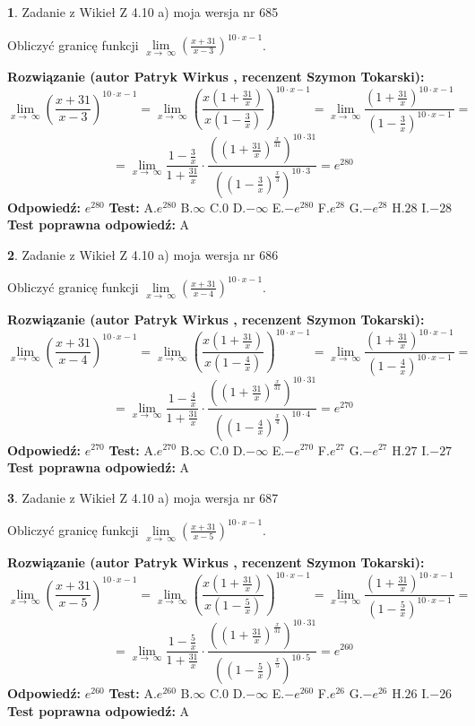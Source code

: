 \documentclass[12pt, a4paper]{article}
\theoremstyle{definition} %
\newtheorem{zad}{}
\newcommand{\zadStart}[1]{\begin{zad}#1\newline}
\newcommand{\zadStop}{\end{zad}}
\newcommand{\rozwStart}[2]{\noindent \textbf{Rozwiązanie (autor #1 , recenzent #2): }\newline}
\newcommand{\rozwStop}{\newline}
\newcommand{\odpStart}{\noindent \textbf{Odpowiedź:}\newline}
\newcommand{\odpStop}{\newline}
\newcommand{\testStart}{\noindent \textbf{Test:}\newline}
\newcommand{\testStop}{\newline}
\newcommand{\kluczStart}{\noindent \textbf{Test poprawna odpowiedź:}\newline}
\newcommand{\kluczStop}{\newline}
\begin{document}
\zadStart{Zadanie z Wikieł Z 4.10 a) moja wersja nr 685}

Obliczyć granicę funkcji  $\lim\limits_{x\to\ \infty}(\frac{x+31}{x-3})^{10\cdot x-1}$.
\zadStop
\rozwStart{Patryk Wirkus}{Szymon Tokarski}
$$\lim\limits_{x\to\ \infty}(\frac{x+31}{x-3})^{10\cdot x-1} = \lim\limits_{x\to\ \infty}(\frac{x(1+\frac{31}{x})}{x(1-\frac{3}{x})})^{10\cdot x-1}=\lim\limits_{x\to\ \infty}\frac{(1+\frac{31}{x})^{10\cdot x-1}}{(1-\frac{3}{x})^{10\cdot x-1}}=$$
$$=\lim\limits_{x\to\ \infty}\frac{1-\frac{3}{x}}{1+\frac{31}{x}}\cdot\frac{((1+\frac{31}{x})^{\frac{x}{31}})^{10\cdot31}}{((1-\frac{3}{x})^{\frac{x}{3}})^{10\cdot3}}=e^{280}$$
\rozwStop
\odpStart
$e^{280}$
\odpStop
\testStart
A.$e^{280}$ B.$\infty$ C.$0$ D.$-\infty$ E.$-e^{280}$
F.$e^{28}$ G.$-e^{28}$
H.$28$
I.$-28$
\testStop
\kluczStart
A
\kluczStop



\zadStart{Zadanie z Wikieł Z 4.10 a) moja wersja nr 686}

Obliczyć granicę funkcji  $\lim\limits_{x\to\ \infty}(\frac{x+31}{x-4})^{10\cdot x-1}$.
\zadStop
\rozwStart{Patryk Wirkus}{Szymon Tokarski}
$$\lim\limits_{x\to\ \infty}(\frac{x+31}{x-4})^{10\cdot x-1} = \lim\limits_{x\to\ \infty}(\frac{x(1+\frac{31}{x})}{x(1-\frac{4}{x})})^{10\cdot x-1}=\lim\limits_{x\to\ \infty}\frac{(1+\frac{31}{x})^{10\cdot x-1}}{(1-\frac{4}{x})^{10\cdot x-1}}=$$
$$=\lim\limits_{x\to\ \infty}\frac{1-\frac{4}{x}}{1+\frac{31}{x}}\cdot\frac{((1+\frac{31}{x})^{\frac{x}{31}})^{10\cdot31}}{((1-\frac{4}{x})^{\frac{x}{4}})^{10\cdot4}}=e^{270}$$
\rozwStop
\odpStart
$e^{270}$
\odpStop
\testStart
A.$e^{270}$ B.$\infty$ C.$0$ D.$-\infty$ E.$-e^{270}$
F.$e^{27}$ G.$-e^{27}$
H.$27$
I.$-27$
\testStop
\kluczStart
A
\kluczStop



\zadStart{Zadanie z Wikieł Z 4.10 a) moja wersja nr 687}

Obliczyć granicę funkcji  $\lim\limits_{x\to\ \infty}(\frac{x+31}{x-5})^{10\cdot x-1}$.
\zadStop
\rozwStart{Patryk Wirkus}{Szymon Tokarski}
$$\lim\limits_{x\to\ \infty}(\frac{x+31}{x-5})^{10\cdot x-1} = \lim\limits_{x\to\ \infty}(\frac{x(1+\frac{31}{x})}{x(1-\frac{5}{x})})^{10\cdot x-1}=\lim\limits_{x\to\ \infty}\frac{(1+\frac{31}{x})^{10\cdot x-1}}{(1-\frac{5}{x})^{10\cdot x-1}}=$$
$$=\lim\limits_{x\to\ \infty}\frac{1-\frac{5}{x}}{1+\frac{31}{x}}\cdot\frac{((1+\frac{31}{x})^{\frac{x}{31}})^{10\cdot31}}{((1-\frac{5}{x})^{\frac{x}{5}})^{10\cdot5}}=e^{260}$$
\rozwStop
\odpStart
$e^{260}$
\odpStop
\testStart
A.$e^{260}$ B.$\infty$ C.$0$ D.$-\infty$ E.$-e^{260}$
F.$e^{26}$ G.$-e^{26}$
H.$26$
I.$-26$
\testStop
\kluczStart
A
\kluczStop
\end{document}
